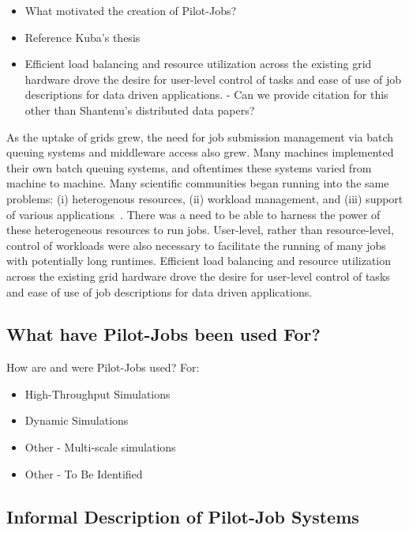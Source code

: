 \documentclass{sig-alternate}
\begin{document}
\begin{itemize}
\item What motivated the creation of Pilot-Jobs?
\item Reference Kuba's thesis
\item Efficient load balancing and resource utilization across the existing grid hardware drove the desire for user-level control of tasks and ease of use of job descriptions for data driven applications. - Can we provide citation for this other than Shantenu's distributed data papers?
\end{itemize}

As the uptake of grids grew, the need for job submission management via batch queuing systems and middleware access also grew. Many machines implemented their own batch queuing systems, and oftentimes these systems varied from machine to machine. Many scientific communities began running into the same problems: (i) heterogenous resources, (ii) workload management, and (iii) support of various applications~\cite{cern-slides}. There was a need to be able to harness the power of these heterogeneous resources to run jobs. User-level, rather than resource-level, control of workloads were also necessary to facilitate the running of many jobs with potentially long runtimes. Efficient load balancing and resource utilization across the existing grid hardware drove the desire for user-level control of tasks and ease of use of job descriptions for data driven applications.

\subsection{What have Pilot-Jobs been used For?}

How are and were Pilot-Jobs used?
For:
\begin{itemize}
\item High-Throughput Simulations
\item Dynamic Simulations
\item Other - Multi-scale simulations  
\item Other - To Be Identified
\end{itemize}

\subsection{Informal Description of Pilot-Job Systems}
\end{document}

